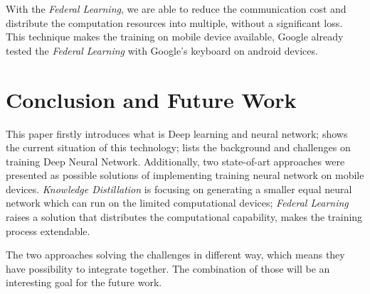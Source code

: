 \documentclass[article]{aaltoseries}
\begin{document}
With the \emph{Federal Learning}, we are able to reduce the communication cost and distribute the computation resources into multiple,
without a significant loss.
This technique makes the training on mobile device available, Google already tested the \emph{Federal Learning} with Google's keyboard
on android devices\cite{BrendanMcMahanandDanielRamage2017}.







\section{Conclusion and Future Work}
\label{sec:conclusion}

This paper firstly introduces what is Deep learning and neural network; shows the current situation of this technology;
lists the background and challenges on training Deep Neural Network. Additionally, two state-of-art approaches were 
presented as possible solutions of implementing training neural network on mobile devices. \emph{Knowledge Distillation} 
is focusing on generating a smaller equal neural network which can run on the limited computational devices; 
\emph{Federal Learning} raises a solution that distributes the computational capability, makes the training process
extendable. 

The two approaches solving the challenges in different way, which means they have possibility to integrate together. 
The combination of those will be an interesting goal for the future work. 







\end{document}
